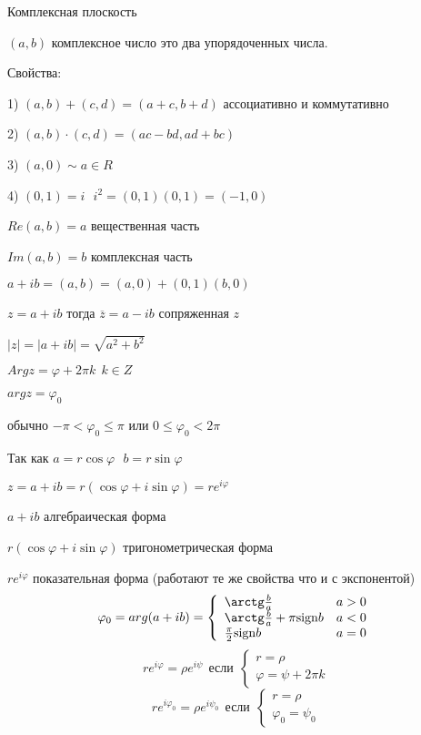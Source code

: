 \begin{title}[\Large]
  Комплексная плоскость
\end{title}

\begin{block}
  $(a,b)$ комплексное число это два упорядоченных числа.

  Свойства:

  1) $(a,b) + (c,d) = (a+c, b+d)$ ассоциативно и коммутативно

  2) $(a,b)\cdot(c,d) = (ac - bd, ad + bc)$

  3) $(a,0) \sim a \in R$

  4) $(0,1) = i ~~~ i^2 = (0,1)(0,1) = (-1,0)$

  $Re(a,b) = a$ вещественная часть

  $Im(a,b) = b$ комплексная часть

  $a + ib = (a,b) = (a,0) + (0,1)(b,0)$

  $z = a + ib$ тогда $\overline{z} = a - ib$ сопряженная $z$

  $|z| = |a + ib| = \sqrt{a^2 + b^2}$

  $Arg z = \varphi + 2\pi k ~~ k \in Z$

  $arg z = \varphi_0$

  обычно $-\pi < \varphi_0 \le \pi$ или $0 \le \varphi_0 < 2\pi$

  Так как $a = r \cos \varphi ~~~ b = r \sin \varphi$

  $z = a + ib = r(\cos \varphi + i \sin \varphi) = r e^{i\varphi}$

  $a + ib$ алгебраическая форма

  $r(\cos \varphi + i \sin \varphi)$ тригонометрическая форма

  $r e^{i\varphi}$ показательная форма (работают те же свойства что и с
  экспонентой)
  $$
  \varphi_0 = arg(a + ib) =
  \left\{
  \begin{array}{lc}
    \arctg \frac{b}{a} & a > 0 \\
    \arctg \frac{b}{a} + \pi \sign b & a < 0 \\
    \frac{\pi}{2} \sign b & a = 0
  \end{array}
  \right.
  $$
  $$
  re^{i\varphi} = \rho e^{i\psi} ~~ \text{если} ~~
  \left\{
  \begin{array}{l}
    r = \rho \\
    \varphi = \psi + 2\pi k
  \end{array}
  \right.
  $$
  $$
  re^{i\varphi_0} = \rho e^{i\psi_0} ~~ \text{если} ~~
  \left\{
  \begin{array}{l}
    r = \rho \\
    \varphi_0 = \psi_0
  \end{array}
  \right.
  $$


\end{block}
